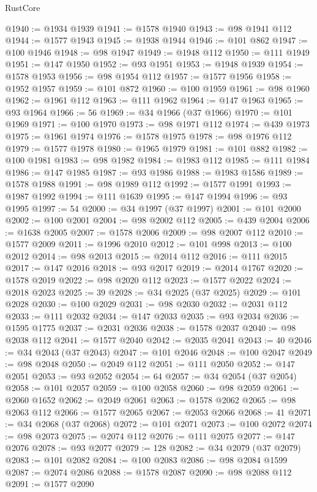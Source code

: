 \begin{lexlean}{RustCore}
\begin{coremodule}
@1940 := @1934 @1939
@1941 := @1578 @1940
@1943 := @98 @1941 @112
@1944 := @1577 @1943
@1945 := @1938 @1944
@1946 := @101 @862
@1947 := @100 @1946
@1948 := @98 @1947
@1949 := @1948 @112
@1950 := @111 @1949
@1951 := @147 @1950
@1952 := @93 @1951
@1953 := @1948 @1939
@1954 := @1578 @1953
@1956 := @98 @1954 @112
@1957 := @1577 @1956
@1958 := @1952 @1957
@1959 := @101 @872
@1960 := @100 @1959
@1961 := @98 @1960
@1962 := @1961 @112
@1963 := @111 @1962
@1964 := @147 @1963
@1965 := @93 @1964
@1966 := 56
@1969 := @34 @1966 (@37 @1966)
@1970 := @101 @1969
@1971 := @100 @1970
@1973 := @98 @1971 @112
@1974 := @439 @1973
@1975 := @1961 @1974
@1976 := @1578 @1975
@1978 := @98 @1976 @112
@1979 := @1577 @1978
@1980 := @1965 @1979
@1981 := @101 @882
@1982 := @100 @1981
@1983 := @98 @1982
@1984 := @1983 @112
@1985 := @111 @1984
@1986 := @147 @1985
@1987 := @93 @1986
@1988 := @1983 @1586
@1989 := @1578 @1988
@1991 := @98 @1989 @112
@1992 := @1577 @1991
@1993 := @1987 @1992
@1994 := @111 @1639
@1995 := @147 @1994
@1996 := @93 @1995
@1997 := 54
@2000 := @34 @1997 (@37 @1997)
@2001 := @101 @2000
@2002 := @100 @2001
@2004 := @98 @2002 @112
@2005 := @439 @2004
@2006 := @1638 @2005
@2007 := @1578 @2006
@2009 := @98 @2007 @112
@2010 := @1577 @2009
@2011 := @1996 @2010
@2012 := @101 @998
@2013 := @100 @2012
@2014 := @98 @2013
@2015 := @2014 @112
@2016 := @111 @2015
@2017 := @147 @2016
@2018 := @93 @2017
@2019 := @2014 @1767
@2020 := @1578 @2019
@2022 := @98 @2020 @112
@2023 := @1577 @2022
@2024 := @2018 @2023
@2025 := 39
@2028 := @34 @2025 (@37 @2025)
@2029 := @101 @2028
@2030 := @100 @2029
@2031 := @98 @2030
@2032 := @2031 @112
@2033 := @111 @2032
@2034 := @147 @2033
@2035 := @93 @2034
@2036 := @1595 @1775
@2037 := @2031 @2036
@2038 := @1578 @2037
@2040 := @98 @2038 @112
@2041 := @1577 @2040
@2042 := @2035 @2041
@2043 := 40
@2046 := @34 @2043 (@37 @2043)
@2047 := @101 @2046
@2048 := @100 @2047
@2049 := @98 @2048
@2050 := @2049 @112
@2051 := @111 @2050
@2052 := @147 @2051
@2053 := @93 @2052
@2054 := 64
@2057 := @34 @2054 (@37 @2054)
@2058 := @101 @2057
@2059 := @100 @2058
@2060 := @98 @2059
@2061 := @2060 @1652
@2062 := @2049 @2061
@2063 := @1578 @2062
@2065 := @98 @2063 @112
@2066 := @1577 @2065
@2067 := @2053 @2066
@2068 := 41
@2071 := @34 @2068 (@37 @2068)
@2072 := @101 @2071
@2073 := @100 @2072
@2074 := @98 @2073
@2075 := @2074 @112
@2076 := @111 @2075
@2077 := @147 @2076
@2078 := @93 @2077
@2079 := 128
@2082 := @34 @2079 (@37 @2079)
@2083 := @101 @2082
@2084 := @100 @2083
@2086 := @98 @2084 @1599
@2087 := @2074 @2086
@2088 := @1578 @2087
@2090 := @98 @2088 @112
@2091 := @1577 @2090

\end{coremodule}
\end{lexlean}
